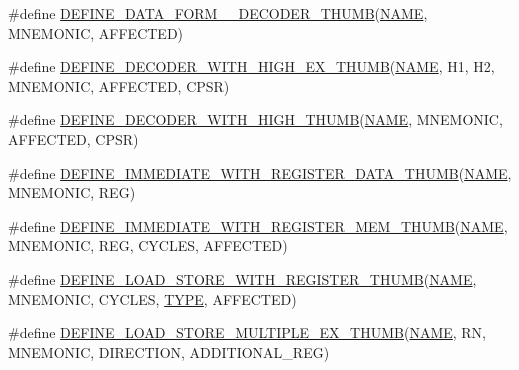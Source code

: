 \begin{DoxyCompactItemize}
\#define \mbox{\hyperlink{decoder-thumb_8c_acd7668ae86478d08503b23da9f322bb6}{D\+E\+F\+I\+N\+E\+\_\+\+D\+A\+T\+A\+\_\+\+F\+O\+R\+M\+\_\+\_\+\+D\+E\+C\+O\+D\+E\+R\+\_\+\+T\+H\+U\+MB}}(\mbox{\hyperlink{inflate_8h_a164ea0159d5f0b5f12a646f25f99eceaa67bc2ced260a8e43805d2480a785d312}{N\+A\+ME}},  M\+N\+E\+M\+O\+N\+IC,  A\+F\+F\+E\+C\+T\+ED)
\item 
\#define \mbox{\hyperlink{decoder-thumb_8c_a77b4e7b16f8500ba7de60167582fb945}{D\+E\+F\+I\+N\+E\+\_\+\+D\+E\+C\+O\+D\+E\+R\+\_\+\+W\+I\+T\+H\+\_\+\+H\+I\+G\+H\+\_\+\+E\+X\+\_\+\+T\+H\+U\+MB}}(\mbox{\hyperlink{inflate_8h_a164ea0159d5f0b5f12a646f25f99eceaa67bc2ced260a8e43805d2480a785d312}{N\+A\+ME}},  H1,  H2,  M\+N\+E\+M\+O\+N\+IC,  A\+F\+F\+E\+C\+T\+ED,  C\+P\+SR)
\item 
\#define \mbox{\hyperlink{decoder-thumb_8c_a1cdba0ed9acb6df2c67d9fd1b620ea06}{D\+E\+F\+I\+N\+E\+\_\+\+D\+E\+C\+O\+D\+E\+R\+\_\+\+W\+I\+T\+H\+\_\+\+H\+I\+G\+H\+\_\+\+T\+H\+U\+MB}}(\mbox{\hyperlink{inflate_8h_a164ea0159d5f0b5f12a646f25f99eceaa67bc2ced260a8e43805d2480a785d312}{N\+A\+ME}},  M\+N\+E\+M\+O\+N\+IC,  A\+F\+F\+E\+C\+T\+ED,  C\+P\+SR)
\item 
\#define \mbox{\hyperlink{decoder-thumb_8c_a34ad2c15aa07473aa0f2ace6296f0504}{D\+E\+F\+I\+N\+E\+\_\+\+I\+M\+M\+E\+D\+I\+A\+T\+E\+\_\+\+W\+I\+T\+H\+\_\+\+R\+E\+G\+I\+S\+T\+E\+R\+\_\+\+D\+A\+T\+A\+\_\+\+T\+H\+U\+MB}}(\mbox{\hyperlink{inflate_8h_a164ea0159d5f0b5f12a646f25f99eceaa67bc2ced260a8e43805d2480a785d312}{N\+A\+ME}},  M\+N\+E\+M\+O\+N\+IC,  R\+EG)
\item 
\#define \mbox{\hyperlink{decoder-thumb_8c_a03f28aff1515febe3ffdad67692ad9ee}{D\+E\+F\+I\+N\+E\+\_\+\+I\+M\+M\+E\+D\+I\+A\+T\+E\+\_\+\+W\+I\+T\+H\+\_\+\+R\+E\+G\+I\+S\+T\+E\+R\+\_\+\+M\+E\+M\+\_\+\+T\+H\+U\+MB}}(\mbox{\hyperlink{inflate_8h_a164ea0159d5f0b5f12a646f25f99eceaa67bc2ced260a8e43805d2480a785d312}{N\+A\+ME}},  M\+N\+E\+M\+O\+N\+IC,  R\+EG,  C\+Y\+C\+L\+ES,  A\+F\+F\+E\+C\+T\+ED)
\item 
\#define \mbox{\hyperlink{decoder-thumb_8c_ad33a2ab848982a59bbc1e2ab929d9b55}{D\+E\+F\+I\+N\+E\+\_\+\+L\+O\+A\+D\+\_\+\+S\+T\+O\+R\+E\+\_\+\+W\+I\+T\+H\+\_\+\+R\+E\+G\+I\+S\+T\+E\+R\+\_\+\+T\+H\+U\+MB}}(\mbox{\hyperlink{inflate_8h_a164ea0159d5f0b5f12a646f25f99eceaa67bc2ced260a8e43805d2480a785d312}{N\+A\+ME}},  M\+N\+E\+M\+O\+N\+IC,  C\+Y\+C\+L\+ES,  \mbox{\hyperlink{inflate_8h_a164ea0159d5f0b5f12a646f25f99eceaab47ea8bb955afd0adc0ef98517dd6084}{T\+Y\+PE}},  A\+F\+F\+E\+C\+T\+ED)
\item 
\#define \mbox{\hyperlink{decoder-thumb_8c_aaa81a7373807ab43c5b56789bf6628ea}{D\+E\+F\+I\+N\+E\+\_\+\+L\+O\+A\+D\+\_\+\+S\+T\+O\+R\+E\+\_\+\+M\+U\+L\+T\+I\+P\+L\+E\+\_\+\+E\+X\+\_\+\+T\+H\+U\+MB}}(\mbox{\hyperlink{inflate_8h_a164ea0159d5f0b5f12a646f25f99eceaa67bc2ced260a8e43805d2480a785d312}{N\+A\+ME}},  RN,  M\+N\+E\+M\+O\+N\+IC,  D\+I\+R\+E\+C\+T\+I\+ON,  A\+D\+D\+I\+T\+I\+O\+N\+A\+L\+\_\+\+R\+EG)

\end{DoxyCompactItemize}
